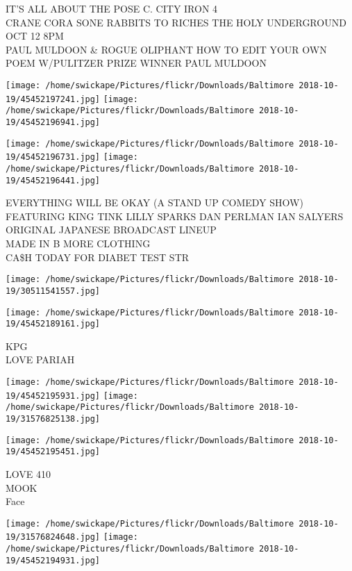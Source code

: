 \documentclass[10pt,letterpaper]{article}
\begin{document}
IT'S ALL ABOUT THE POSE C. CITY IRON 4\\
CRANE CORA SONE RABBITS TO RICHES THE HOLY UNDERGROUND OCT 12 8PM\\
PAUL MULDOON \& ROGUE OLIPHANT HOW TO EDIT YOUR OWN POEM W/PULITZER PRIZE WINNER PAUL MULDOON\\
\pagebreak

\texttt{[image: /home/swickape/Pictures/flickr/Downloads/Baltimore 2018-10-19/45452197241.jpg]}
\texttt{[image: /home/swickape/Pictures/flickr/Downloads/Baltimore 2018-10-19/45452196941.jpg]}

\texttt{[image: /home/swickape/Pictures/flickr/Downloads/Baltimore 2018-10-19/45452196731.jpg]}
\texttt{[image: /home/swickape/Pictures/flickr/Downloads/Baltimore 2018-10-19/45452196441.jpg]}

EVERYTHING WILL BE OKAY (A STAND UP COMEDY SHOW) FEATURING KING TINK LILLY SPARKS DAN PERLMAN IAN SALYERS\\
ORIGINAL JAPANESE BROADCAST LINEUP\\
MADE IN B MORE CLOTHING\\
CA\$H TODAY FOR DIABET TEST STR\\
\pagebreak

\texttt{[image: /home/swickape/Pictures/flickr/Downloads/Baltimore 2018-10-19/30511541557.jpg]}

\vspace{0.25in}
\texttt{[image: /home/swickape/Pictures/flickr/Downloads/Baltimore 2018-10-19/45452189161.jpg]}

KPG\\
LOVE PARIAH\\
\pagebreak

\texttt{[image: /home/swickape/Pictures/flickr/Downloads/Baltimore 2018-10-19/45452195931.jpg]}
\texttt{[image: /home/swickape/Pictures/flickr/Downloads/Baltimore 2018-10-19/31576825138.jpg]}

\vspace{0.25in}
\texttt{[image: /home/swickape/Pictures/flickr/Downloads/Baltimore 2018-10-19/45452195451.jpg]}

LOVE 410\\
MOOK\\
Face\\
\pagebreak

\texttt{[image: /home/swickape/Pictures/flickr/Downloads/Baltimore 2018-10-19/31576824648.jpg]}
\texttt{[image: /home/swickape/Pictures/flickr/Downloads/Baltimore 2018-10-19/45452194931.jpg]}
\end{document}
